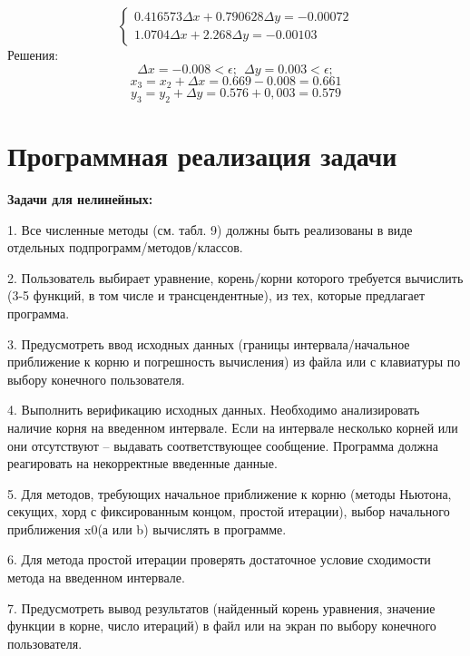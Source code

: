 \documentclass{article}
\begin{document}
\[\begin{cases}
    0.416573\Delta x +0.790628\Delta y = -0.00072\\
    1.0704\Delta x + 2.268\Delta y = -0.00103
\end{cases} 
\]
Решения:
\[\Delta x = -0.008 < \epsilon; \ \ 
\Delta y = 0.003 < \epsilon;
\]
\[x_3 = x_2 + \Delta x = 0.669 - 0.008 = 0.661\]
\[y_3 = y_2 + \Delta y = 0.576 + 0,003 = 0.579\]

\section{Программная реализация задачи}
\textbf{Задачи для нелинейных:}

1. Все численные методы (см. табл. 9) должны быть реализованы в виде отдельных подпрограмм/методов/классов.

2. Пользователь выбирает уравнение, корень/корни которого требуется вычислить (3-5 функций, в том числе и трансцендентные), из тех, которые предлагает программа.

3. Предусмотреть ввод исходных данных (границы интервала/начальное приближение к корню и погрешность вычисления) из файла или с клавиатуры по
выбору конечного пользователя.

4. Выполнить верификацию исходных данных. Необходимо анализировать наличие корня на введенном интервале. Если на интервале несколько корней или
они отсутствуют – выдавать соответствующее сообщение. Программа должна
реагировать на некорректные введенные данные.

5. Для методов, требующих начальное приближение к корню (методы Ньютона,
секущих, хорд с фиксированным концом, простой итерации), выбор начального приближения x0(а или b) вычислять в программе.

6. Для метода простой итерации проверять достаточное условие сходимости метода на введенном интервале.

7. Предусмотреть вывод результатов (найденный корень уравнения, значение
функции в корне, число итераций) в файл или на экран по выбору конечного
пользователя.
\end{document}
